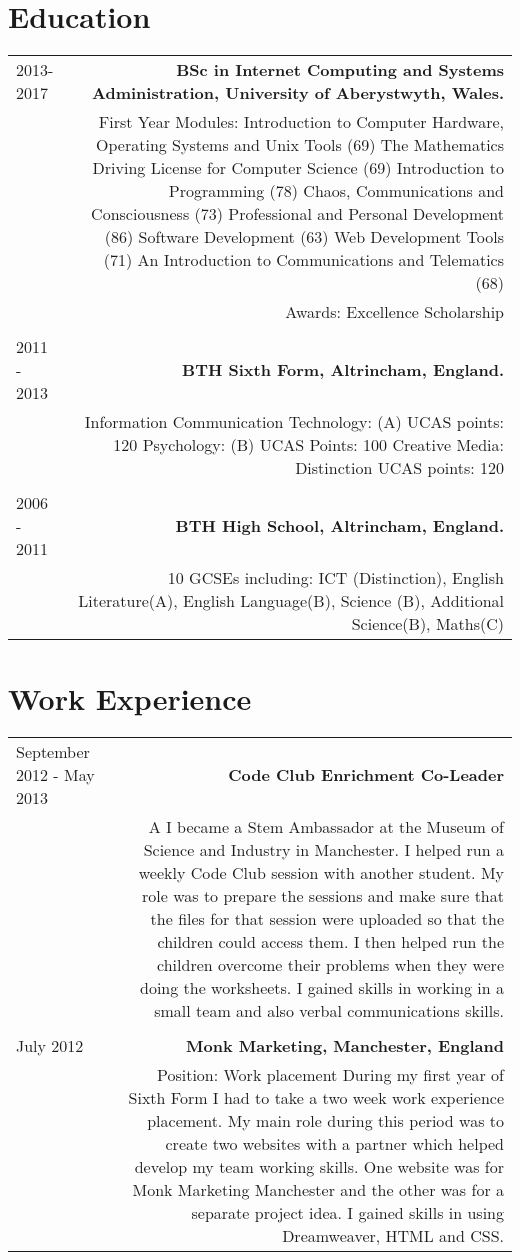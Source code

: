 \documentclass[a4paper,10pt]{article}
\begin{document}
\section*{Education}
\begin{tabular}{L!{\VRule}R}
\\2013-2017&{\bf BSc in Internet Computing and Systems Administration, University of Aberystwyth, Wales. }\\[5pt]
&First Year Modules: 
Introduction to Computer Hardware, Operating Systems and Unix Tools (69) The Mathematics Driving License for Computer Science (69)
Introduction to Programming (78)
Chaos, Communications and Consciousness (73)
Professional and Personal Development (86)
Software Development (63)
Web Development Tools (71)
An Introduction to Communications and Telematics (68)\\
&Awards: Excellence Scholarship\\
\\
2011 - 2013&{\bf BTH Sixth Form, Altrincham, England.}\\[5pt]
&Information Communication Technology: (A) UCAS points: 120
Psychology: (B) UCAS Points: 100
Creative Media: Distinction UCAS points: 120\\
\\
2006 - 2011&{\bf BTH High School, Altrincham, England.}\\[5pt]
&10 GCSEs including: ICT (Distinction), English Literature(A), English Language(B), Science (B), Additional Science(B), Maths(C)
\end{tabular}
\section*{Work Experience}
\begin{tabular}{L!{\VRule}R}
September 2012 - May 2013&{\bf Code Club Enrichment Co-Leader}\\[5pt]
&A I became a Stem Ambassador at the Museum of Science and Industry in Manchester. I helped run a weekly Code Club session with another student. My role was to prepare the sessions and make sure that the files for that session were uploaded so that the children could access them. I then helped run the children overcome their problems when they were doing the worksheets. I gained skills in working in a small team and also verbal communications skills.\\
\\
July 2012&{\bf Monk Marketing, Manchester, England }\\[5pt]
&Position: Work placement
During my first year of Sixth Form I had to take a two week work experience placement. My main role during this period was to create two websites with a partner which helped develop my team working skills. One website was for Monk Marketing Manchester and the other was for a separate project idea. I gained skills in using Dreamweaver, HTML and CSS.\\
\end{tabular}
\end{document}
